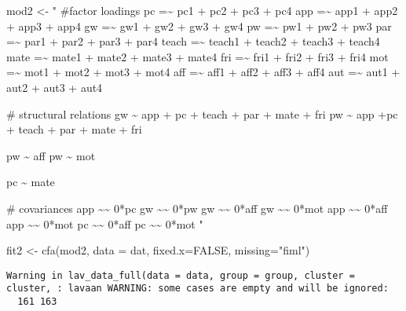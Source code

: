 \documentclass[
  letterpaper,
  DIV=11,
  numbers=noendperiod]{scrartcl}
\newenvironment{Shaded}{\begin{snugshade}}{\end{snugshade}}
\newcommand{\AttributeTok}[1]{\textcolor[rgb]{0.40,0.45,0.13}{#1}}
\newcommand{\ConstantTok}[1]{\textcolor[rgb]{0.56,0.35,0.01}{#1}}
\newcommand{\FunctionTok}[1]{\textcolor[rgb]{0.28,0.35,0.67}{#1}}
\newcommand{\NormalTok}[1]{\textcolor[rgb]{0.00,0.23,0.31}{#1}}
\newcommand{\OtherTok}[1]{\textcolor[rgb]{0.00,0.23,0.31}{#1}}
\newcommand{\StringTok}[1]{\textcolor[rgb]{0.13,0.47,0.30}{#1}}
\begin{document}
\begin{Shaded}
\begin{Highlighting}[]
\NormalTok{mod2 }\OtherTok{\textless{}{-}} \StringTok{"}
\StringTok{\#factor loadings}
\StringTok{pc =\textasciitilde{} pc1 + pc2 + pc3 + pc4}
\StringTok{app =\textasciitilde{} app1 + app2 + app3 + app4}
\StringTok{gw =\textasciitilde{} gw1 + gw2 + gw3 + gw4}
\StringTok{pw =\textasciitilde{} pw1 + pw2 + pw3}
\StringTok{par =\textasciitilde{} par1 + par2 + par3 + par4}
\StringTok{teach =\textasciitilde{} teach1 + teach2 + teach3 + teach4}
\StringTok{mate =\textasciitilde{} mate1 + mate2 + mate3 + mate4}
\StringTok{fri =\textasciitilde{} fri1 + fri2 + fri3 + fri4}
\StringTok{mot =\textasciitilde{} mot1 + mot2 + mot3 + mot4}
\StringTok{aff =\textasciitilde{} aff1 + aff2 + aff3 + aff4}
\StringTok{aut =\textasciitilde{} aut1 + aut2 + aut3 + aut4}

\StringTok{\# structural relations}
\StringTok{gw \textasciitilde{} app + pc + teach + par + mate + fri}
\StringTok{pw \textasciitilde{} app +pc + teach + par + mate + fri}

\StringTok{pw \textasciitilde{} aff}
\StringTok{pw \textasciitilde{} mot}

\StringTok{pc \textasciitilde{} mate}

\StringTok{\# covariances}
\StringTok{app \textasciitilde{}\textasciitilde{} 0*pc}
\StringTok{gw \textasciitilde{}\textasciitilde{} 0*pw}
\StringTok{gw \textasciitilde{}\textasciitilde{} 0*aff}
\StringTok{gw \textasciitilde{}\textasciitilde{} 0*mot}
\StringTok{app \textasciitilde{}\textasciitilde{} 0*aff}
\StringTok{app \textasciitilde{}\textasciitilde{} 0*mot}
\StringTok{pc \textasciitilde{}\textasciitilde{} 0*aff}
\StringTok{pc \textasciitilde{}\textasciitilde{} 0*mot}
\StringTok{"}
\end{Highlighting}
\end{Shaded}

\begin{Shaded}
\begin{Highlighting}[]
\NormalTok{fit2 }\OtherTok{\textless{}{-}} \FunctionTok{cfa}\NormalTok{(mod2, }\AttributeTok{data =}\NormalTok{ dat, }\AttributeTok{fixed.x=}\ConstantTok{FALSE}\NormalTok{, }\AttributeTok{missing=}\StringTok{"fiml"}\NormalTok{)}
\end{Highlighting}
\end{Shaded}

\begin{verbatim}
Warning in lav_data_full(data = data, group = group, cluster = cluster, : lavaan WARNING: some cases are empty and will be ignored:
  161 163
\end{verbatim}
\end{document}
